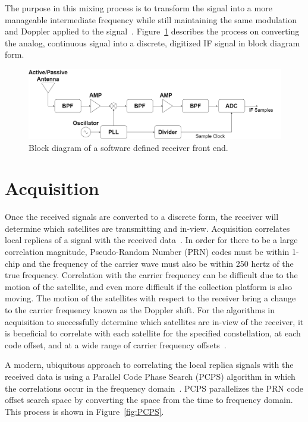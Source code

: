 The purpose in this mixing process is to transform the signal into a more manageable intermediate frequency while still maintaining the same modulation and Doppler applied to the signal~\cite{bradfordparkinsonGlobalPositioningSystem1996}. Figure~\ref{fig:frontend} describes the process on converting the analog, continuous signal into a discrete, digitized IF signal in block diagram form.

\begin{figure}[!ht]
    \centering
    \includegraphics[width=\linewidth]{Figures/frontend.drawio.png}
    \caption{Block diagram of a software defined receiver front end.}\label{fig:frontend}
\end{figure}

\section{\textbf{Acquisition}}
Once the received signals are converted to a discrete form, the receiver will determine which satellites are transmitting and in-view. Acquisition correlates local replicas of a signal with the received data~\cite{akosEffectSamplingFrequency2006}. In order for there to be a large correlation magnitude, Pseudo-Random Number (PRN) codes must be within 1-chip and the frequency of the carrier wave must also be within 250 hertz of the true frequency. Correlation with the carrier frequency can be difficult due to the motion of the satellite, and even more difficult if the collection platform is also moving. The motion of the satellites with respect to the receiver bring a change to the carrier frequency known as the Doppler shift. For the algorithms in acquisition to successfully determine which satellites are in-view of the receiver, it is beneficial to correlate with each satellite for the specified constellation, at each code offset, and at a wide range of carrier frequency offsets~\cite{kaplanUnderstandingGPSPrinciples2006}.

A modern, ubiquitous approach to correlating the local replica signals with the received data is using a Parallel Code Phase Search (PCPS) algorithm in which the correlations occur in the frequency domain~\cite{scottRapidSignalAcquisition2001}. PCPS parallelizes the PRN code offset search space by converting the space from the time to frequency domain. This process is shown in Figure~\ref{fig:PCPS}.

